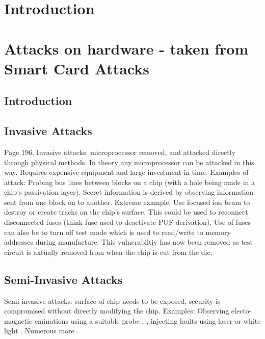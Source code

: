 \section{Introduction}
\section{Attacks on hardware - taken from Smart Card Attacks}
\subsection{Introduction}
\subsection{Invasive Attacks}
Page 196.
Invasive attacks: microprocessor removed, and attacked directly through physical methods.
In theory any microprocessor can be attacked in this way.
Requires expensive equipment and large investment in time.
Examples of attack:
Probing bus lines between blocks on a chip (with a hole being made in a chip's passivation layer). Secret information is derived by observing information sent from one block on to another.
Extreme example: Use focused ion beam to destroy or create tracks on the chip's surface. This could be used to reconnect disconnected fuses (think fuse used to deactivate PUF derivation). Use of fuses can also be to turn off test mode which is used to read/write to memory addresses during manufacture. This vulnerabiltiy has now been removed as test circuit is axtually removed from when the chip is cut from the die. \cite{Anderson1996} \cite{Kommerling1999}
\subsection{Semi-Invasive Attacks}
Semi-invasive attacks: surface of chip needs to be exposed, security is compromised without directly modifying the chip.
Examples: Observing electo-magnetic eminations using a suitable probe \cite{Gandolfi2007}, \cite{Quisquater2001}, injecting faults using laser \cite{Bar-el2006} or white light \cite{Skorobogatov2007}. Numerous more \cite{Skorobogatov2005}.
